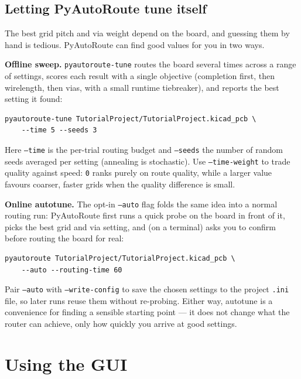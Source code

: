 \documentclass[11pt,a4paper]{article}
\begin{document}
\subsection{Letting PyAutoRoute tune itself}
\label{sec:autotune}

The best grid pitch and via weight depend on the board, and guessing them
by hand is tedious. PyAutoRoute can find good values for you in two ways.

\textbf{Offline sweep.} \texttt{pyautoroute-tune} routes the board several
times across a range of settings, scores each result with a single
objective (completion first, then wirelength, then vias, with a small
runtime tiebreaker), and reports the best setting it found:

\begin{lstlisting}
pyautoroute-tune TutorialProject/TutorialProject.kicad_pcb \
    --time 5 --seeds 3
\end{lstlisting}

Here \texttt{--time} is the per-trial routing budget and \texttt{--seeds}
the number of random seeds averaged per setting (annealing is stochastic).
Use \texttt{--time-weight} to trade quality against speed: \texttt{0} ranks
purely on route quality, while a larger value favours coarser, faster grids
when the quality difference is small.

\textbf{Online autotune.} The opt-in \texttt{--auto} flag folds the same
idea into a normal routing run: PyAutoRoute first runs a quick probe on the
board in front of it, picks the best grid and via setting, and (on a
terminal) asks you to confirm before routing the board for real:

\begin{lstlisting}
pyautoroute TutorialProject/TutorialProject.kicad_pcb \
    --auto --routing-time 60
\end{lstlisting}

Pair \texttt{--auto} with \texttt{--write-config} to save the chosen
settings to the project \texttt{.ini} file, so later runs reuse them
without re-probing. Either way, autotune is a convenience for finding a
sensible starting point --- it does not change what the router can achieve,
only how quickly you arrive at good settings.

\section{Using the GUI}
\end{document}
